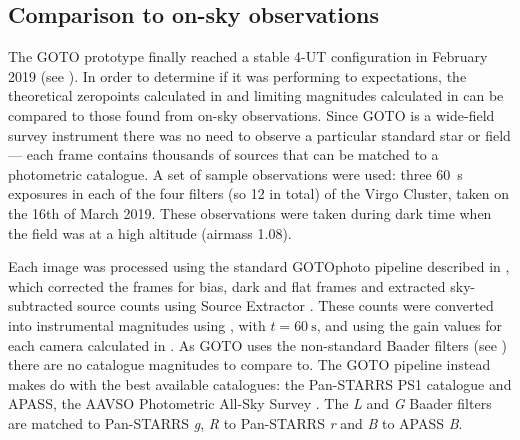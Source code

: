 \begin{colsection}
\newpage

\end{colsection}


\subsection{Comparison to on-sky observations}
\label{sec:onsky_comparison}
\begin{colsection}

The GOTO prototype finally reached a stable 4-UT configuration in February 2019 (see ). In order to determine if it was performing to expectations, the theoretical zeropoints calculated in  and limiting magnitudes calculated in  can be compared to those found from on-sky observations. Since GOTO is a wide-field survey instrument there was no need to observe a particular standard star or field --- each frame contains thousands of sources that can be matched to a photometric catalogue. A set of sample observations were used: three \SI{60}{\second} exposures in each of the four filters (so 12 in total) of the Virgo Cluster, taken on the 16th of March 2019. These observations were taken during dark time when the field was at a high altitude (airmass 1.08).

Each image was processed using the standard GOTOphoto pipeline described in , which corrected the frames for bias, dark and flat frames and extracted sky-subtracted source counts using Source Extractor \citep{SE}. These counts were converted into instrumental magnitudes using , with $t=\SI{60}{\second}$, and using the gain values for each camera calculated in . As GOTO uses the non-standard Baader filters (see ) there are no catalogue magnitudes to compare to. The GOTO pipeline instead makes do with the best available catalogues: the Pan-STARRS PS1 catalogue \citep{Pan-STARRS} and APASS, the AAVSO Photometric All-Sky Survey \citep{APASS}. The \textit{L} and \textit{G} Baader filters are matched to Pan-STARRS \textit{g}, \textit{R} to Pan-STARRS \textit{r} and \textit{B} to APASS \textit{B}.

\newpage


\end{colsection}
